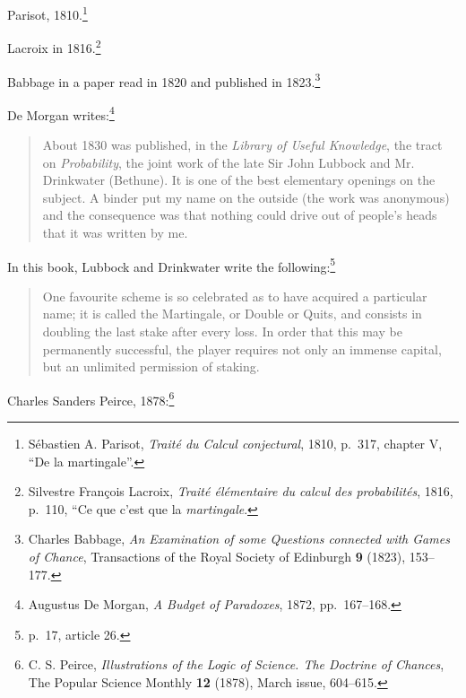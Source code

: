 \documentclass{article}
\begin{document}
Parisot, 1810.\footnote{S\'ebastien A. Parisot, {\em Trait\'e du Calcul conjectural}, 1810, p.~317, chapter V, ``De la martingale''.}

Lacroix in 1816.\footnote{Silvestre Fran\c{c}ois Lacroix, {\em Trait\'e \'el\'ementaire du calcul des probabilit\'es}, 1816,
p.~110, ``Ce que c'est que la {\em martingale}.}

Babbage in a paper read in 1820 and published in 1823.\footnote{Charles Babbage, {\em An Examination of some Questions connected with Games
of Chance}, Transactions of the Royal Society of Edinburgh \textbf{9} (1823), 153--177.}

De Morgan writes:\footnote{Augustus De Morgan, {\em A Budget of Paradoxes}, 1872, pp.~167--168.}
\begin{quote}
About 1830 was published, in the {\em Library of Useful Knowledge}, the tract on {\em Probability}, the joint work
of the late Sir John Lubbock and Mr. Drinkwater (Bethune). It is one of the best elementary openings on the subject.
A binder put my name on the outside (the work was anonymous) and the consequence was that nothing could drive
out of people's heads that it was written by me.
\end{quote}

In this book, Lubbock and Drinkwater write the following:\footnote{p.~17, article 26.}

\begin{quote}
One favourite scheme is so celebrated as to have acquired a particular name; it is called the Martingale, or Double
or Quits, and consists in doubling the last stake after every loss. In order that this may be
permanently successful, the player requires not only an immense capital, but an unlimited permission of staking.
\end{quote}

Charles Sanders Peirce, 1878:\footnote{C. S. Peirce, {\em Illustrations of the Logic of Science. The Doctrine of Chances}, 
The Popular Science Monthly \textbf{12} (1878), March issue, 604--615.}
\end{document}
